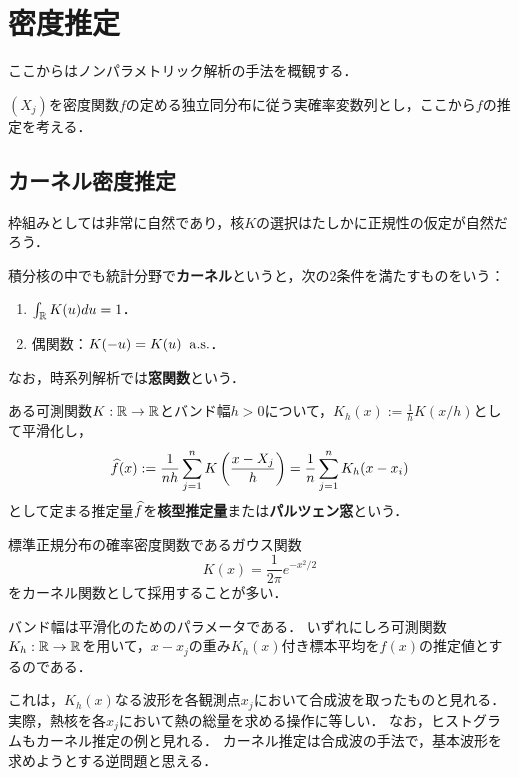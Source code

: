 \documentclass[uplatex,dvipdfmx]{jsreport}
\begin{document}
\section{密度推定}

\begin{tcolorbox}[colframe=ForestGreen, colback=ForestGreen!10!white,breakable,colbacktitle=ForestGreen!40!white,coltitle=black,fonttitle=\bfseries\sffamily,
title=]
    ここからはノンパラメトリック解析の手法を概観する．
\end{tcolorbox}

\begin{notation}
    $(X_j)$を密度関数$f$の定める独立同分布に従う実確率変数列とし，ここから$f$の推定を考える．
\end{notation}

\subsection{カーネル密度推定}

\begin{tcolorbox}[colframe=ForestGreen, colback=ForestGreen!10!white,breakable,colbacktitle=ForestGreen!40!white,coltitle=black,fonttitle=\bfseries\sffamily,
title=]
    枠組みとしては非常に自然であり，核$K$の選択はたしかに正規性の仮定が自然だろう．
\end{tcolorbox}

\begin{definition}
    積分核の中でも統計分野で\textbf{カーネル}というと，次の2条件を満たすものをいう：
    \begin{enumerate}
        \item $\int_{\mathbb{R}} K(u)du=1$．
        \item 偶関数：$K(-u)=K(u)\;\;\mathrm{a.s.}$．
    \end{enumerate}
    なお，時系列解析では\textbf{窓関数}という．
\end{definition}

\begin{definition}
    ある可測関数$K:\mathbb{R}\to\mathbb{R}$とバンド幅$h>0$について，$K_h(x):=\frac{1}{h}K(x/h)$として平滑化し，
    \[\widehat{f}(x):=\frac{1}{nh}\sum^n_{j=1}K\left(\frac{x-X_j}{h}\right)=\frac{1}{n}\sum^n_{j=1}K_h(x-x_i)\]
    として定まる推定量$\widehat{f}$を\textbf{核型推定量}または\textbf{パルツェン窓}という．
\end{definition}
\begin{example}
    標準正規分布の確率密度関数であるガウス関数
    \[K(x)=\frac{1}{2\pi}e^{-x^2/2}\]
    をカーネル関数として採用することが多い．
\end{example}
\begin{remarks}
    バンド幅は平滑化のためのパラメータである．
    いずれにしろ可測関数$K_h:\mathbb{R}\to\mathbb{R}$を用いて，$x-x_j$の重み$K_h(x)$付き標本平均を$f(x)$の推定値とするのである．

    これは，$K_h(x)$なる波形を各観測点$x_j$において合成波を取ったものと見れる．実際，熱核を各$x_j$において熱の総量を求める操作に等しい．
    なお，ヒストグラムもカーネル推定の例と見れる．
    カーネル推定は合成波の手法で，基本波形を求めようとする逆問題と思える．
\end{remarks}
\end{document}

